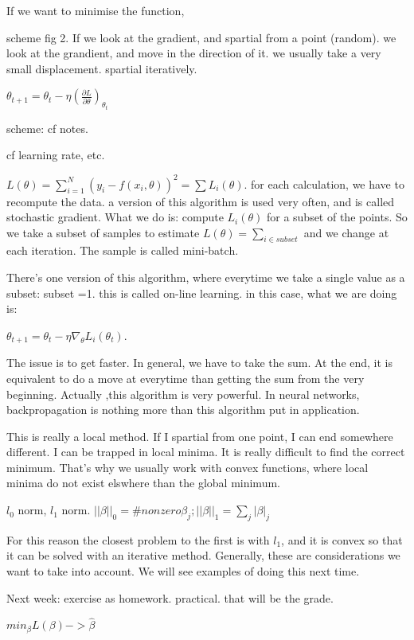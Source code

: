 \documentclass[a4paper]{tufte-book}
\begin{document}
If we want to minimise the function,

scheme fig 2.
If we look at the gradient, and spartial from a point (random). we look at the
grandient, and move in the direction of it.
we usually take a very small displacement. spartial iteratively.

$\theta_{t+1} = \theta_{t} - \eta \left( \frac{\partial L}{\partial \theta}\right)_{\theta_{t}}$

scheme: cf notes.

cf learning rate, etc.

$L(\theta) = \sum_{i=1}^N (y_i - f(x_i,\theta))^2
= \sum L_i(\theta)$.
for each calculation, we have to recompute the data.
a version of this algorithm is used very often, and is called stochastic gradient.
What we do is: compute $L_i(\theta)$ for a subset of the points.
So we take a subset of samples to estimate $L(\theta) = \sum_{i\in subset}$ and we
change at each iteration.
The sample is called mini-batch.

There's one version of this algorithm, where everytime we take a single value as
a subset: subset =1. this is called on-line learning. in this case, what we are
doing is:

$\theta_{t+1} = \theta_{t} - \eta \nabla_\theta L_i(\theta_{t})$.

The issue is to get faster. In general, we have to take the sum.
At the end, it is equivalent to do a move at everytime than getting the sum from
the very beginning.
Actually ,this algorithm is very powerful. In neural networks, backpropagation
is nothing more than this algorithm put in application.

This is really a local method. If I spartial from one point, I can end somewhere
different. I can be trapped in local minima. It is really difficult to find the 
correct minimum. That's why we usually work with convex functions, where local
minima do not exist elswhere than the global minimum.

$l_0$ norm, $l_1$ norm.
$||\beta||_0 = \# nonzero \beta_j ; ||\beta||_1 = \sum_j |\beta|_j$

For this reason the closest problem to the first is with $l_1$, and it is convex
so that it can be solved with an iterative method. Generally, these are
considerations we want to take into account.
We will see examples of doing this next time.

Next week: exercise as homework. practical.
that will be the grade.

$min_\beta L(\beta) -> \hat \beta$
\end{document}
